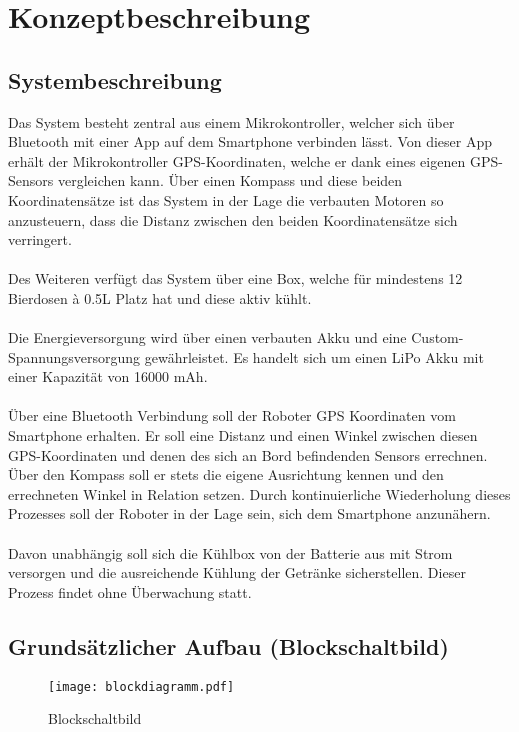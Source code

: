 \section{Konzeptbeschreibung}

\subsection{Systembeschreibung}
Das System besteht zentral aus einem Mikrokontroller, welcher sich über Bluetooth mit einer App auf dem Smartphone verbinden lässt. Von dieser App erhält der Mikrokontroller GPS-Koordinaten, welche er dank eines eigenen GPS-Sensors vergleichen kann. Über einen Kompass und diese beiden Koordinatensätze ist das System in der Lage die verbauten Motoren so anzusteuern, dass die Distanz zwischen den beiden Koordinatensätze sich verringert. \\
\\
Des Weiteren verfügt das System über eine Box, welche für mindestens 12 Bierdosen à 0.5L Platz hat und diese aktiv kühlt.\\ \\
Die Energieversorgung wird über einen verbauten Akku und eine Custom-Spannungsversorgung gewährleistet. Es handelt sich um einen LiPo Akku mit einer Kapazität von 16000 mAh.\\
\\
Über eine Bluetooth Verbindung soll der Roboter GPS Koordinaten vom Smartphone erhalten. Er soll eine Distanz und einen Winkel zwischen diesen GPS-Koordinaten und denen des sich an Bord befindenden Sensors errechnen. Über den Kompass soll er stets die eigene Ausrichtung kennen und den errechneten Winkel in Relation setzen. Durch kontinuierliche Wiederholung dieses Prozesses soll der Roboter in der Lage sein, sich dem Smartphone anzunähern.\\
\\
Davon unabhängig soll sich die Kühlbox von der Batterie aus mit Strom versorgen und die ausreichende Kühlung der Getränke sicherstellen. Dieser Prozess findet ohne Überwachung statt.

\subsection{Grundsätzlicher Aufbau (Blockschaltbild)}
\begin{figure}[H]
    \begin{center}
    \texttt{[image: blockdiagramm.pdf]}
    \end{center}
    \caption{Blockschaltbild}
\end{figure}

